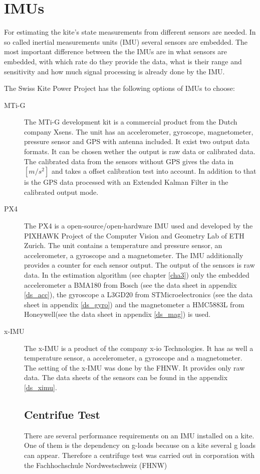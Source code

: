 \chapter{IMUs}\label{cha2}

For estimating the kite's state measurements from different sensors are needed. In so called inertial measurements units (IMU)  several sensors are embedded. The most important difference between the the IMUs are in what sensors are embedded, with which rate do they provide the data, what is their range and sensitivity and how much signal processing is already done by the IMU.

The Swiss Kite Power Project has the following options of IMUs to choose:

\begin{description}
\item[MTi-G]
The MTi-G development kit is a commercial product from the Dutch company Xsens. The unit has an accelerometer, gyroscope, magnetometer, pressure sensor and GPS with antenna included. It exist two output data formats. It can be chosen wether the output is raw data or calibrated data. The calibrated data from the sensors without GPS gives the data in $[m/s^2]$ and takes a offset calibration test into account. In addition to that is the GPS data processed with an Extended  Kalman Filter in the calibrated output mode.

\item[PX4]
The PX4 is a open-source/open-hardware IMU used and developed by the PIXHAWK Project of the Computer Vision and Geometry Lab of ETH Zurich. The unit contains a temperature and pressure sensor, an accelerometer, a gyroscope and a magnetometer. The IMU additionally provides a counter for each sensor output. The output of the sensors is raw data. In the estimation algorithm (see chapter \ref{cha3}) only the embedded accelerometer a BMA180 from Bosch (see the data sheet in appendix \ref{ds_acc}), the gyroscope a L3GD20 from STMicroelectronics (see the data sheet in appendix \ref {ds_gyro}) and the magnetometer a HMC5883L from Honeywell(see the data sheet in appendix \ref{ds_mag}) is used.

\item[x-IMU]
The x-IMU is a product of the company x-io Technologies. It has as well a temperature sensor, a accelerometer, a gyroscope and a magnetometer. The setting of the x-IMU was done by the FHNW. It provides only raw data. The data sheets of the sensors can be found in the appendix \ref{ds_ximu}.
\section{Centrifue Test}
There are several performance requirements on an IMU installed on a kite. One of them is the dependency on g-loads because on a kite several g loads can appear. Therefore a centrifuge test was carried out in corporation with the Fachhochschule Nordwestschweiz (FHNW)

\end{description}
